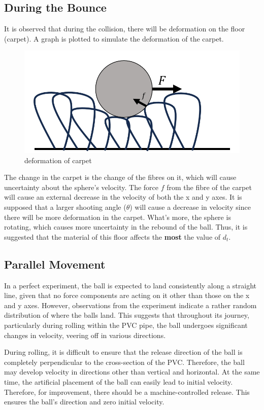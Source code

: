 \documentclass{article}
\begin{document}
    \subsection{During the Bounce}
         It is observed that during the collision, there will be deformation on the floor (carpet). A graph is plotted to simulate the deformation of the carpet.
         \begin{figure}[H]
             \centering
             \includegraphics[width=0.5\linewidth]{deformation_carpet.png}
             \caption{deformation of carpet}
             \label{fig:de-carpet}
         \end{figure}
         The change in the carpet is the change of the fibres on it, which will cause uncertainty about the sphere's velocity. The force $f$ from the fibre of the carpet will cause an external decrease in the velocity of both the x and y axes. It is supposed that a larger shooting angle ($\theta$) will cause a decrease in velocity since there will be more deformation in the carpet. What's more, the sphere is rotating, which causes more uncertainty in the rebound of the ball. Thus, it is suggested that the material of this floor affects the \textbf{most} the value of $d_t$.
    \subsection{Parallel Movement}
        In a perfect experiment, the ball is expected to land consistently along a straight line, given that no force components are acting on it other than those on the x and y axes. However, observations from the experiment indicate a rather random distribution of where the balls land. This suggests that throughout its journey, particularly during rolling within the PVC pipe, the ball undergoes significant changes in velocity, veering off in various directions.\par
        During rolling, it is difficult to ensure that the release direction of the ball is completely perpendicular to the cross-section of the PVC. Therefore, the ball may develop velocity in directions other than vertical and horizontal. At the same time, the artificial placement of the ball can easily lead to initial velocity. Therefore, for improvement, there should be a machine-controlled release. This ensures the ball's direction and zero initial velocity.
\end{document}
